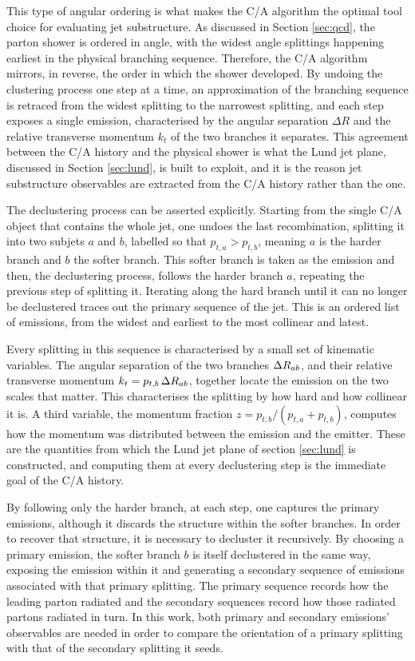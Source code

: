 This type of angular ordering is what makes the C/A algorithm the optimal tool choice
for evaluating jet substructure. As discussed in Section \ref{sec:qcd}, the parton
shower is ordered in angle, with the widest angle splittings happening earliest
in the physical branching sequence. Therefore, the C/A algorithm mirrors, in reverse,
the order in which the shower developed. By undoing the clustering process one step at 
a time, an approximation of the branching sequence is retraced from the widest splitting
to the narrowest splitting, and each step exposes a  single emission, characterised by the
angular separation $\Delta R$ and the relative transverse momentum $k_t$ of the two branches it separates.
This agreement between the C/A history and the physical shower is what the Lund jet plane,
discussed in Section \ref{sec:lund}, is built to exploit, and it is the reason
jet substructure observables are extracted from the C/A history rather than the
\antikt{} one.

The declustering process can be asserted explicitly. Starting from the single C/A
object that contains the whole jet, one undoes the last recombination, splitting it
into two subjets $a$ and $b$, labelled so that $p_{t,a} > p_{t,b}$, meaning $a$ is
the harder branch and $b$ the softer branch.
This softer branch is taken as the emission and then, the declustering process, follows
the harder branch $a$, repeating the previous step of splitting it.
Iterating along the hard branch until it
can no longer be declustered traces out the primary sequence of the jet. This is 
an ordered list of emissions, from the widest and earliest to the most collinear
and latest.

Every splitting in this sequence is characterised by a small set of kinematic variables.
The angular separation of the two branches $\Delta R_{ab}$, and their relative transverse
momentum $k_t = p_{t,b}\,\Delta R_{ab}$, together locate the emission on the two scales
that matter. This characterises the splitting by how hard and how collinear it is. A third variable,
the momentum fraction $z = p_{t,b}/(p_{t,a} + p_{t,b})$, computes how the momentum was distributed
between the emission and the emitter.
These are the quantities from which the Lund jet plane of section \ref{sec:lund} is
constructed, and computing them at every declustering step is the immediate goal of the C/A history.

By following only the harder branch, at each step, one captures the primary emissions, although
it discards the structure within the softer branches. In order to recover that structure, it is
necessary to decluster it recursively. By choosing a primary emission, the softer branch
$b$ is itself declustered in the same way, exposing the emission within it and generating a secondary
sequence of emissions associated with that primary splitting. The primary
sequence records how the leading parton radiated and the secondary sequences record how
those radiated partons radiated in turn. In this work, both primary and secondary emissions'
observables are needed in order to compare the orientation of a primary splitting with
that of the secondary splitting it seeds.

